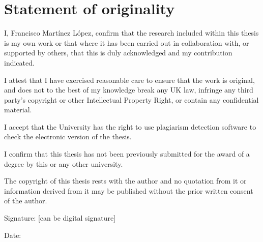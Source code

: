 \chapter*{Statement of originality}
\label{C:Statement}

I, Francisco Mart\'{i}nez L\'{o}pez, confirm that the research included
within this thesis is my own work or that where it has been carried out in collaboration with, or supported by others, that this is duly acknowledged and my contribution indicated.

\bigskip

\noindent
I attest that I have exercised reasonable care to ensure that the work is
original, and does not to the best of my knowledge break any UK law, infringe any third party's copyright or other Intellectual Property Right, or contain any confidential material.

\bigskip

\noindent
I accept that the University has the right to use plagiarism detection software to check the electronic version of the thesis.

\bigskip

\noindent
I confirm that this thesis has not been previously submitted for the award of a degree by this or any other university.

\bigskip

\noindent
The copyright of this thesis rests with the author and no quotation from it or information derived from it may be published without the prior written consent of the author.

\bigskip

\noindent
Signature: [can be digital signature]

\noindent
Date:

\bigskip